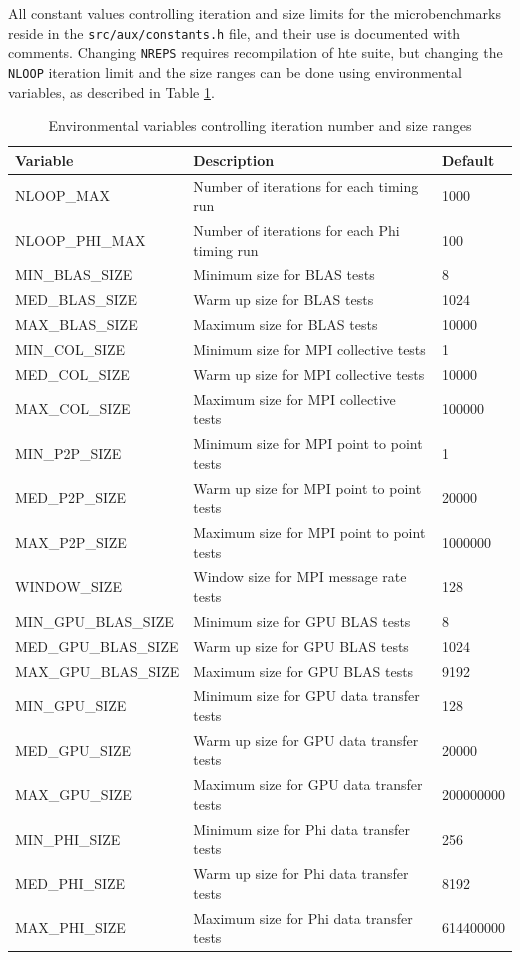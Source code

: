 \documentclass[10pt,a4paper]{report}
\begin{document}
All constant values controlling iteration and size limits for the microbenchmarks reside in the \texttt{src/aux/constants.h} file, and their use is documented with comments. Changing \verb+NREPS+ requires recompilation of hte suite, but changing the \verb+NLOOP+ iteration limit and the size ranges can be done using environmental variables, as described in Table \ref{tab:env}.

\begin{table}[ht]
\centering
\caption{Environmental variables controlling iteration number and size ranges}
\label{tab:env}
\begin{tabular}{|l|l|l|}
\hline
\bf{Variable}	& \bf{Description}                          & \bf{Default}\\\hline
NLOOP\_MAX      & Number of iterations for each timing run  & 1000\\
NLOOP\_PHI\_MAX & Number of iterations for each Phi timing run  & 100\\
MIN\_BLAS\_SIZE & Minimum size for BLAS tests               & 8\\
MED\_BLAS\_SIZE & Warm up size for BLAS tests               & 1024\\
MAX\_BLAS\_SIZE & Maximum size for BLAS tests               & 10000\\
MIN\_COL\_SIZE  & Minimum size for MPI collective tests     & 1\\
MED\_COL\_SIZE  & Warm up size for MPI collective tests     & 10000\\
MAX\_COL\_SIZE  & Maximum size for MPI collective tests     & 100000\\
MIN\_P2P\_SIZE  & Minimum size for MPI point to point tests & 1\\
MED\_P2P\_SIZE  & Warm up size for MPI point to point tests & 20000\\
MAX\_P2P\_SIZE  & Maximum size for MPI point to point tests & 1000000\\
WINDOW\_SIZE    & Window size for MPI message rate tests    & 128\\
MIN\_GPU\_BLAS\_SIZE & Minimum size for GPU BLAS tests      & 8\\
MED\_GPU\_BLAS\_SIZE & Warm up size for GPU BLAS tests      & 1024\\
MAX\_GPU\_BLAS\_SIZE & Maximum size for GPU BLAS tests      & 9192\\
MIN\_GPU\_SIZE  & Minimum size for GPU data transfer tests  & 128\\
MED\_GPU\_SIZE  & Warm up size for GPU data transfer tests  & 20000\\
MAX\_GPU\_SIZE  & Maximum size for GPU data transfer tests  & 200000000\\
MIN\_PHI\_SIZE  & Minimum size for Phi data transfer tests  & 256\\
MED\_PHI\_SIZE  & Warm up size for Phi data transfer tests  & 8192\\
MAX\_PHI\_SIZE  & Maximum size for Phi data transfer tests  & 614400000\\\hline
\end{tabular}
\end{table}
\end{document}
